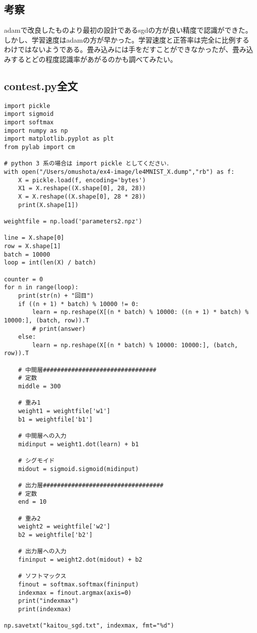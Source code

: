 \documentclass{ujarticle}
\begin{document}
\subsection{考察}
adamで改良したものより最初の設計であるsgdの方が良い精度で認識ができた。しかし、学習速度はadamの方が早かった。学習速度と正答率は完全に比例するわけではないようである。畳み込みには手をだすことができなかったが、畳み込みするとどの程度認識率があがるのかも調べてみたい。

\subsection{contest.py全文}
\begin{lstlisting}[basicstyle=\ttfamily\footnotesize, frame=single]
import pickle
import sigmoid
import softmax
import numpy as np
import matplotlib.pyplot as plt
from pylab import cm

# python 3 系の場合は import pickle としてください．
with open("/Users/omushota/ex4-image/le4MNIST_X.dump","rb") as f:
    X = pickle.load(f, encoding='bytes')
    X1 = X.reshape((X.shape[0], 28, 28))
    X = X.reshape((X.shape[0], 28 * 28))
    print(X.shape[1])

weightfile = np.load('parameters2.npz')

line = X.shape[0]
row = X.shape[1]
batch = 10000
loop = int(len(X) / batch)

counter = 0
for n in range(loop):
    print(str(n) + "回目")
    if ((n + 1) * batch) % 10000 != 0:
        learn = np.reshape(X[(n * batch) % 10000: ((n + 1) * batch) % 10000:], (batch, row)).T
        # print(answer)
    else:
        learn = np.reshape(X[(n * batch) % 10000: 10000:], (batch, row)).T

    # 中間層################################
    # 定数
    middle = 300

    # 重み1
    weight1 = weightfile['w1']
    b1 = weightfile['b1']

    # 中間層への入力
    midinput = weight1.dot(learn) + b1

    # シグモイド
    midout = sigmoid.sigmoid(midinput)

    # 出力層##################################
    # 定数
    end = 10

    # 重み2
    weight2 = weightfile['w2']
    b2 = weightfile['b2']

    # 出力層への入力
    fininput = weight2.dot(midout) + b2

    # ソフトマックス
    finout = softmax.softmax(fininput)
    indexmax = finout.argmax(axis=0)
    print("indexmax")
    print(indexmax)

np.savetxt("kaitou_sgd.txt", indexmax, fmt="%d")
\end{lstlisting}
\end{document}
